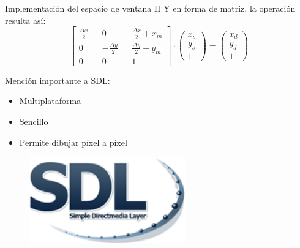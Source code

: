 \documentclass{beamer}
\begin{document}
\begin{frame}{Implementación del espacio de ventana II}
  Y en forma de matriz, la operación resulta así:
  \begin{equation*}
  \begin{bmatrix}
     \frac{\Delta x}{2} && 0 && \frac{\Delta x}{2} + x_m\\
     0 && - \frac{\Delta y}{2} && \frac{\Delta y}{2} + y_m \\
     0 && 0 && 1
  \end{bmatrix}
  \cdot
  \begin{pmatrix}
    x_s\\
    y_s\\
    1
  \end{pmatrix}
  =
  \begin{pmatrix}
    x_d\\
    y_d\\
    1
  \end{pmatrix}
  \end{equation*}

  \vfill
  \begin{minipage}{0.5\textwidth}
    Mención importante a SDL:
  \begin{itemize}
  \item{Multiplataforma}
  \item{Sencillo}
  \item{Permite dibujar píxel a píxel}
  \end{itemize}

  \end{minipage}
  \begin{minipage}{0.4\textwidth}
    \begin{figure}[h]
    \centering
    \includegraphics[width=0.6\textwidth]{img/SDL_logo}
    \end{figure}

  \end{minipage}

\end{frame}
\end{document}
